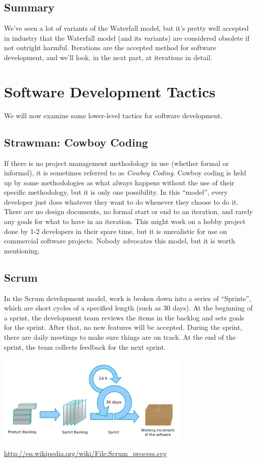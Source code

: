 \subsection*{Summary}
We've seen a lot of variants of the Waterfall model, but it's pretty well accepted in industry that the Waterfall model (and its variants) are considered obsolete if not outright harmful. Iterations are the accepted method for software development, and we'll look, in the next part, at iterations in detail.

\section*{Software Development Tactics}

We will now examine some lower-level tactics for software development.

\subsection*{Strawman: Cowboy Coding}
If there is no project management methodology in use (whether formal or informal), it is sometimes referred to as \textit{Cowboy Coding}. Cowboy coding is held up by some methodologies as what always happens without the use of their specific methodology, but it is only one possibility. In this ``model'', every developer just does whatever they want to do whenever they choose to do it. There are no design documents, no formal start or end to an iteration, and rarely any goals for what to have in an iteration. This might work on a hobby project done by 1-2 developers in their spare time, but it is unrealistic for use on commercial software projects. Nobody advocates this model, but it is worth mentioning.

\subsection*{Scrum}
In the Scrum development model, work is broken down into a series of ``Sprints'', which are short cycles of a specified length (such as 30 days). At the beginning of a sprint, the development team reviews the items in the backlog and sets goals for the sprint.  After that, no new features will be accepted. During the sprint, there are daily meetings to make sure things are on track. At the end of the sprint, the team collects feedback for the next sprint. \cite{scrum}

\begin{center}
\includegraphics[width=0.7\textwidth]{images/scrum.png}
\hfill \url{http://en.wikipedia.org/wiki/File:Scrum_process.svg}
\end{center}

